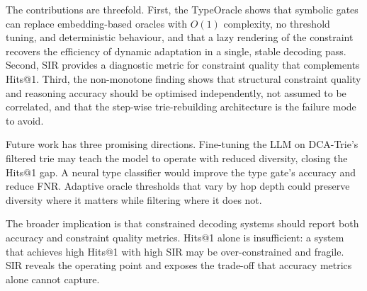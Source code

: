 The contributions are threefold. First, the TypeOracle shows that symbolic gates
can replace embedding-based oracles with $O(1)$ complexity, no threshold tuning, and
deterministic behaviour, and that a lazy rendering of the constraint recovers the
efficiency of dynamic adaptation in a single, stable decoding pass. Second, SIR provides
a diagnostic metric for constraint quality that complements Hits@1. Third, the
non-monotone finding shows that structural constraint quality and reasoning
accuracy should be optimised independently, not assumed to be correlated, and that the
step-wise trie-rebuilding architecture is the failure mode to avoid.

Future work has three promising directions. Fine-tuning the LLM on DCA-Trie's filtered
trie may teach the model to operate with reduced diversity, closing the Hits@1 gap. A
neural type classifier would improve the type gate's accuracy and reduce FNR. Adaptive
oracle thresholds that vary by hop depth could preserve diversity where it matters while
filtering where it does not.

The broader implication is that constrained decoding systems should report both accuracy
and constraint quality metrics. Hits@1 alone is insufficient: a system that achieves
high Hits@1 with high SIR may be over-constrained and fragile. SIR reveals the operating
point and exposes the trade-off that accuracy metrics alone cannot capture.
